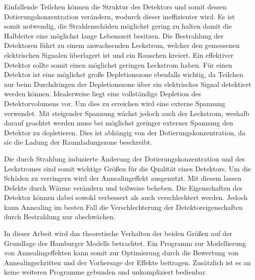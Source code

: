 Einfallende Teilchen können die
Struktur des Detektors und somit dessen Dotierungskonzentration verändern, wodurch dieser ineffizienter wird.
Es ist somit notwendig, die Strahlenschäden möglichst gering zu halten damit
die Halbleiter eine möglichst lange Lebenszeit besitzen.
Die Bestrahlung der Detektoren führt zu einem anwachsenden Leckstrom, welcher den
gemessenen elektrischen Signalen überlagert ist und ein Rauschen kreiert. Ein
effektiver Detektor sollte somit einen möglichst geringen Leckstrom haben.
Für einen Detektor ist eine möglichst große Depletionszone ebenfalls wichtig,
da Teilchen nur beim Durchdringen der Depletionszone über ein elektrisches Signal detektiert
werden können.
Idealerweise
liegt eine vollständige Depletion des Detektorvolumens vor. Um dies zu erreichen wird
eine externe Spannung verwendet. Mit steigender Spannung wächst jedoch auch der Leckstrom, weshalb
darauf geachtet werden muss bei möglichst geringer externer Spannung den Detektor zu depletieren.
Dies ist abhängig von der Dotierungskonzentration, da sie die Ladung der
Raumladungszone beschreibt.

Die durch Strahlung induzierte Änderung der Dotierungskonzentration und des Leckstromes sind
somit wichtige Größen für die Qualität eines Detektors.
Um die Schäden zu verringern wird der Annealingeffekt ausgenutzt. Mit diesem lassen
Defekte durch Wärme verändern und teilweise beheben. Die Eigenschaften des Detektor können
dabei sowohl verbessert als auch verschlechtert werden.
Jedoch kann Annealing im besten Fall die Verschlechterung der Detektoreigenschaften durch Bestrahlung nur
abschwächen.

In dieser Arbeit wird das
theoretische Verhalten der beiden Größen auf der Grundlage des Hamburger Modells betrachtet.
Ein Programm zur Modellierung von Annealingeffekten kann somit zur
Optimierung durch die Bewertung von Annealingschritten und der Vorhersage der Effekte beitragen.
Zusätzlich ist es an keine weiteren Programme gebunden und unkompliziert bedienbar.
